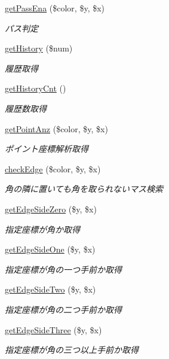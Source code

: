 \begin{DoxyCompactItemize}
\hyperlink{class_reversi_a123959981f8e1d48fc7b9d183a5c6d0a}{get\+Pass\+Ena} (\$color, \$y, \$x)
\begin{DoxyCompactList}\small\item\em パス判定 \end{DoxyCompactList}\item 
\hyperlink{class_reversi_a41cae82a798f2b3d0684bda44b837fcf}{get\+History} (\$num)
\begin{DoxyCompactList}\small\item\em 履歴取得 \end{DoxyCompactList}\item 
\hyperlink{class_reversi_a004834cf9f95ab56b62c1305bbc68ce2}{get\+History\+Cnt} ()
\begin{DoxyCompactList}\small\item\em 履歴数取得 \end{DoxyCompactList}\item 
\hyperlink{class_reversi_af1a30d438a7d17f31353b9d4bfe9cb65}{get\+Point\+Anz} (\$color, \$y, \$x)
\begin{DoxyCompactList}\small\item\em ポイント座標解析取得 \end{DoxyCompactList}\item 
\hyperlink{class_reversi_acd2c64ea43cc26407ad64920a183446b}{check\+Edge} (\$color, \$y, \$x)
\begin{DoxyCompactList}\small\item\em 角の隣に置いても角を取られないマス検索 \end{DoxyCompactList}\item 
\hyperlink{class_reversi_a76a7addedc2b0ba83c6b46ce0601076c}{get\+Edge\+Side\+Zero} (\$y, \$x)
\begin{DoxyCompactList}\small\item\em 指定座標が角か取得 \end{DoxyCompactList}\item 
\hyperlink{class_reversi_a98aff7f2db3a9feacbe98293c6b80eb4}{get\+Edge\+Side\+One} (\$y, \$x)
\begin{DoxyCompactList}\small\item\em 指定座標が角の一つ手前か取得 \end{DoxyCompactList}\item 
\hyperlink{class_reversi_a968982683aa41f50c83789a9be05aaba}{get\+Edge\+Side\+Two} (\$y, \$x)
\begin{DoxyCompactList}\small\item\em 指定座標が角の二つ手前か取得 \end{DoxyCompactList}\item 
\hyperlink{class_reversi_ab299d2488c8ab29f646e449d3204efbc}{get\+Edge\+Side\+Three} (\$y, \$x)
\begin{DoxyCompactList}\small\item\em 指定座標が角の三つ以上手前か取得 \end{DoxyCompactList}\end{DoxyCompactItemize}

